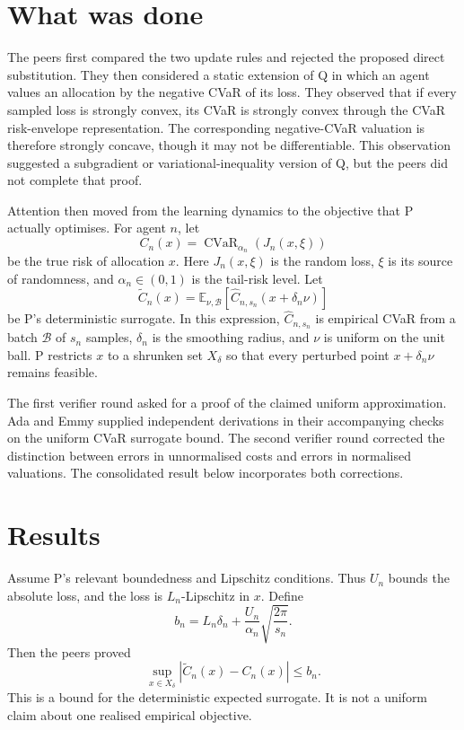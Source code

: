\documentclass{article}
\begin{document}
\section{What was done}

The peers first compared the two update rules and rejected the proposed direct substitution.  They then considered a static extension of Q in which an agent values an allocation by the negative CVaR of its loss.  They observed that if every sampled loss is strongly convex, its CVaR is strongly convex through the CVaR risk-envelope representation.  The corresponding negative-CVaR valuation is therefore strongly concave, though it may not be differentiable.  This observation suggested a subgradient or variational-inequality version of Q, but the peers did not complete that proof.

Attention then moved from the learning dynamics to the objective that P actually optimises.  For agent $n$, let
\[
 C_n(x)=\operatorname{CVaR}_{\alpha_n}(J_n(x,\xi))
\]
be the true risk of allocation $x$.  Here $J_n(x,\xi)$ is the random loss, $\xi$ is its source of randomness, and $\alpha_n\in(0,1)$ is the tail-risk level.  Let
\[
 \widetilde C_n(x)=\mathbb{E}_{\nu,\mathcal B}
 [\widehat C_{n,s_n}(x+\delta_n\nu)]
\]
be P's deterministic surrogate.  In this expression, $\widehat C_{n,s_n}$ is empirical CVaR from a batch $\mathcal B$ of $s_n$ samples, $\delta_n$ is the smoothing radius, and $\nu$ is uniform on the unit ball.  P restricts $x$ to a shrunken set $X_\delta$ so that every perturbed point $x+\delta_n\nu$ remains feasible.

The first verifier round asked for a proof of the claimed uniform approximation.  Ada and Emmy supplied independent derivations in their accompanying checks on the uniform CVaR surrogate bound.  The second verifier round corrected the distinction between errors in unnormalised costs and errors in normalised valuations.  The consolidated result below incorporates both corrections.

\section{Results}

Assume P's relevant boundedness and Lipschitz conditions.  Thus $U_n$ bounds the absolute loss, and the loss is $L_n$-Lipschitz in $x$.  Define
\[
 b_n=L_n\delta_n+\frac{U_n}{\alpha_n}
 \sqrt{\frac{2\pi}{s_n}}.
\]
Then the peers proved
\begin{equation}
 \sup_{x\in X_\delta}|\widetilde C_n(x)-C_n(x)|\leq b_n.
 \label{eq:uniform}
\end{equation}
This is a bound for the deterministic expected surrogate.  It is not a uniform claim about one realised empirical objective.
\end{document}
